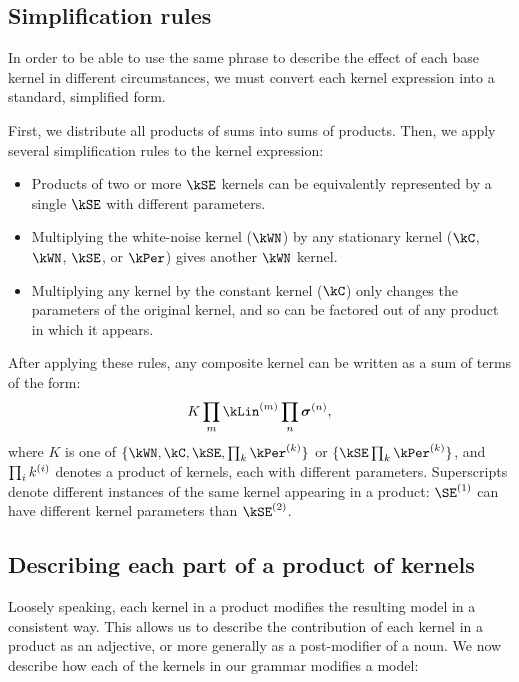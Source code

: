 \subsection{Simplification rules}
\label{sec:desc-simplification}

In order to be able to use the same phrase to describe the effect of each base kernel in different circumstances, we must convert each kernel expression into a standard, simplified form.

First, we distribute all products of sums into sums of products.
Then, we apply several simplification rules to the kernel expression:

\begin{itemize}
\item Products of two or more $\kSE$ kernels can be equivalently represented by a single $\kSE$ with different parameters.
\item Multiplying the white-noise kernel ($\kWN$) by any stationary kernel ($\kC$, $\kWN$, $\kSE$, or $\kPer$) gives another $\kWN$ kernel.
\item Multiplying any kernel by the constant kernel ($\kC$) only changes the parameters of the original kernel, and so can be factored out of any product in which it appears.
\end{itemize}

After applying these rules, any composite kernel can be written as a sum of terms of the form:
\begin{align}
K \prod_m \kLin^{(m)} \prod_n \boldsymbol\sigma^{(n)},
\label{eq:sop}
\end{align}
where $K$ is one of $\{\kWN, \kC, \kSE, \prod_k \kPer^{(k)}\}$ or $\{\kSE \prod_k \kPer^{(k)}\}$, 
and $\prod_ik^{(i)}$ denotes a product of kernels, each with different parameters.
Superscripts denote different instances of the same kernel appearing in a product: $\SE^{(1)}$ can have different kernel parameters than $\kSE^{(2)}$.


\subsection{Describing each part of a product of kernels}

Loosely speaking, each kernel in a product modifies the resulting \gp{} model in a consistent way.
This allows us to describe the contribution of each kernel in a product as an adjective, or more generally as a post-modifier of a noun.
We now describe how each of the kernels in our grammar modifies a \gp{} model:

